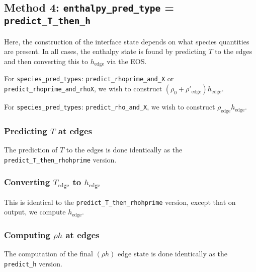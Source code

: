 \subsection{Method 4: {\tt enthalpy\_pred\_type} = {\tt predict\_T\_then\_h}}

Here, the construction of the interface state depends on what species
quantities are present.  In all cases, the enthalpy state is found by
predicting $T$ to the edges and then converting this to
$h_\mathrm{edge}$ via the EOS.

For {\tt species\_pred\_types}: {\tt predict\_rhoprime\_and\_X} or
{\tt predict\_rhoprime\_and\_rhoX}, we wish to construct $(\rho_0 +                                             \rho'_\mathrm{edge} ) h_\mathrm{edge}$.

For {\tt species\_pred\_types}: {\tt predict\_rho\_and\_X}, we wish to
construct $\rho_\mathrm{edge} h_\mathrm{edge}$.



\subsubsection{Predicting $T$ at edges}

The prediction of $T$ to the edges is done identically as the
{\tt predict\_T\_then\_rhohprime} version.


\subsubsection{Converting $T_\mathrm{edge}$ to $h_\mathrm{edge}$}

This is identical to the {\tt predict\_T\_then\_rhohprime} version,
except that on output, we compute $h_\mathrm{edge}$.

\subsubsection{Computing $\rho h$ at edges}

The computation of the final $(\rho h)$ edge state is done identically
as the {\tt predict\_h} version.



